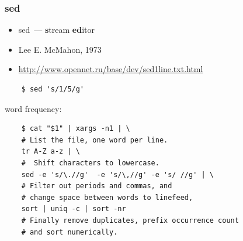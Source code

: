 \documentclass[hyperref={unicode=true}]{beamer}
\begin{document}
\begin{frame}[fragile]
	\frametitle{sed}
	\begin{itemize}
		\item sed~--- \textbf{s}tream \textbf{ed}itor
		\item Lee E. McMahon, 1973
        \item \url{http://www.opennet.ru/base/dev/sed1line.txt.html}
	\end{itemize}

	\begin{addmargin}[1em]{0em}
	\begin{verbatim}
    $ sed 's/1/5/g'
    \end{verbatim}
	\end{addmargin}

    word frequency:
	\begin{addmargin}[1em]{0em}
	\begin{verbatim}
    $ cat "$1" | xargs -n1 | \
    # List the file, one word per line.
    tr A-Z a-z | \
    #  Shift characters to lowercase.
    sed -e 's/\.//g'  -e 's/\,//g' -e 's/ //g' | \
    # Filter out periods and commas, and
    # change space between words to linefeed,
    sort | uniq -c | sort -nr
    # Finally remove duplicates, prefix occurrence count
    # and sort numerically.
    \end{verbatim}
	\end{addmargin}
\end{frame}
\end{document}
